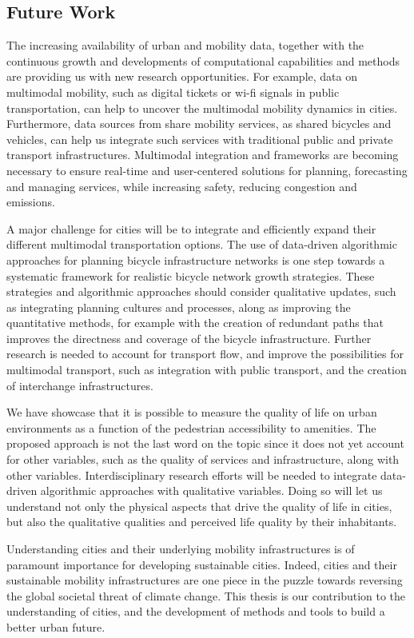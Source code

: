 \subsection*{Future Work}

The increasing availability of urban and mobility data, together with the continuous growth and developments of computational capabilities and methods are providing us with new research opportunities. For example, data on multimodal mobility, such as digital tickets or wi-fi signals in public transportation, can help to uncover the multimodal mobility dynamics in cities. Furthermore, data sources from share mobility services, as shared bicycles and vehicles, can help us integrate such services with traditional public and private transport infrastructures. Multimodal integration and frameworks are becoming necessary to ensure real-time and user-centered solutions for planning, forecasting and managing services, while increasing safety, reducing congestion and emissions.

A major challenge for cities will be to integrate and efficiently expand their different multimodal transportation options. The use of data-driven algorithmic approaches for planning bicycle infrastructure networks is one step towards a systematic framework for realistic bicycle network growth strategies. These strategies and algorithmic approaches should consider  qualitative updates, such as integrating planning cultures and processes, along as improving the quantitative methods, for example with the creation of redundant paths that improves the directness and coverage of the bicycle infrastructure. Further research is needed to account for transport flow, and improve the possibilities for multimodal transport, such as integration with public transport, and the creation of interchange infrastructures.

We have showcase that it is possible to measure the quality of life on urban environments as a function of the pedestrian accessibility to amenities. The proposed approach is not the last word on the topic since it does not yet account for other variables, such as the quality of services and infrastructure, along with other variables. Interdisciplinary research efforts will be needed to integrate data-driven algorithmic approaches with qualitative variables. Doing so will let us understand not only the physical aspects that drive the quality of life in cities, but also the qualitative qualities and perceived life quality by their inhabitants.

Understanding cities and their underlying mobility infrastructures is of paramount importance for developing sustainable cities. Indeed, cities and their sustainable mobility infrastructures are one piece in the puzzle towards reversing the global societal threat of climate change. This thesis is our contribution to the understanding of cities, and the development of methods and tools to build a better urban future. 
